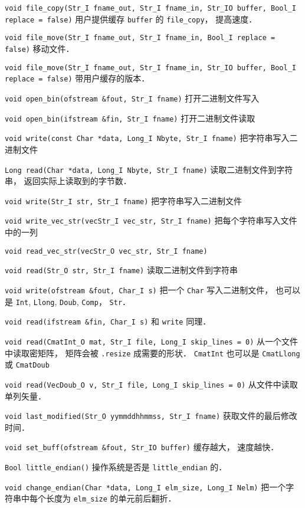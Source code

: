 \verb|void file_copy(Str_I fname_out, Str_I fname_in, Str_IO buffer, Bool_I replace = false)| 用户提供缓存 \verb|buffer| 的 \verb|file_copy|， 提高速度．

\verb|void file_move(Str_I fname_out, Str_I fname_in, Bool_I replace = false)| 移动文件．

\verb|void file_move(Str_I fname_out, Str_I fname_in, Str_IO buffer, Bool_I replace = false)| 带用户缓存的版本．

\verb|void open_bin(ofstream &fout, Str_I fname)| 打开二进制文件写入

\verb|void open_bin(ifstream &fin, Str_I fname)| 打开二进制文件读取

\verb|void write(const Char *data, Long_I Nbyte, Str_I fname)| 把字符串写入二进制文件

\verb|Long read(Char *data, Long_I Nbyte, Str_I fname)| 读取二进制文件到字符串， 返回实际上读取到的字节数．

\verb|void write(Str_I str, Str_I fname)| 把字符串写入二进制文件

\verb|void write_vec_str(vecStr_I vec_str, Str_I fname)| 把每个字符串写入文件中的一列

\verb|void read_vec_str(vecStr_O vec_str, Str_I fname)|

\verb|void read(Str_O str, Str_I fname)| 读取二进制文件到字符串

\verb|void write(ofstream &fout, Char_I s)| 把一个 \verb|Char| 写入二进制文件， 也可以是 \verb|Int|, \verb|Llong|, \verb|Doub|, \verb|Comp|， \verb|Str|．

\verb|void read(ifstream &fin, Char_I s)| 和 \verb|write| 同理．

\verb|void read(CmatInt_O mat, Str_I file, Long_I skip_lines = 0)| 从一个文件中读取密矩阵， 矩阵会被 \verb|.resize| 成需要的形状． \verb|CmatInt| 也可以是 \verb|CmatLlong| 或 \verb|CmatDoub|

\verb|void read(VecDoub_O v, Str_I file, Long_I skip_lines = 0)| 从文件中读取单列矢量．

\verb|void last_modified(Str_O yymmddhhmmss, Str_I fname)| 获取文件的最后修改时间．

\verb|void set_buff(ofstream &fout, Str_IO buffer)| 缓存越大， 速度越快．

\verb|Bool little_endian()| 操作系统是否是 \verb|little_endian| 的．

\verb|void change_endian(Char *data, Long_I elm_size, Long_I Nelm)| 把一个字符串中每个长度为 \verb|elm_size| 的单元前后翻折．
